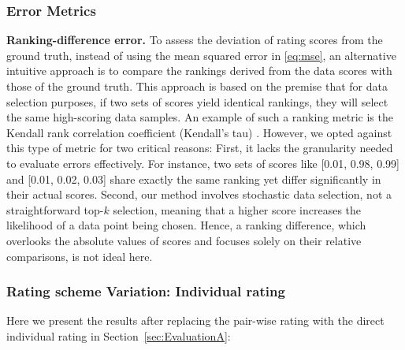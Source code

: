 \documentclass{article}
\begin{document}
\subsubsection{Error Metrics}
\textbf{Ranking-difference error.}
To assess the deviation of rating scores from the ground truth, instead of using the mean squared error in \ref{eq:mse}, an alternative intuitive approach is to compare the rankings derived from the data scores with those of the ground truth. This approach is based on the premise that for data selection purposes, if two sets of scores yield identical rankings, they will select the same high-scoring data samples. An example of such a ranking metric is the Kendall rank correlation coefficient (Kendall’s tau) \citep{kendall1938new}. However, we opted against this type of metric for two critical reasons: First, it lacks the granularity needed to evaluate errors effectively. For instance, two sets of scores like [0.01, 0.98, 0.99] and [0.01, 0.02, 0.03] share exactly the same ranking yet differ significantly in their actual scores. Second, our method involves stochastic data selection, not a straightforward top-$k$ selection, meaning that a higher score increases the likelihood of a data point being chosen. Hence, a ranking difference, which overlooks the absolute values of scores and focuses solely on their relative comparisons, is not ideal here.



\subsubsection{Rating scheme Variation: Individual rating}\label{subsubsec:Appendix-EvalA-Single}
Here we present the results after replacing the pair-wise rating with the direct individual rating in Section~\ref{sec:EvaluationA}:
\end{document}
